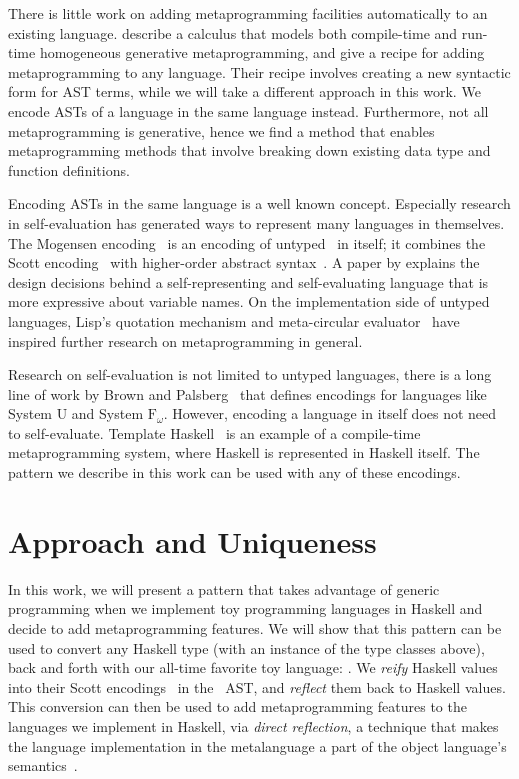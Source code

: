 \documentclass[format=acmsmall, review=false, screen=true]{acmart}
\begin{document}
There is little work on adding metaprogramming facilities automatically to an existing language.
\citet{hgmp} describe a calculus that models both compile-time and run-time homogeneous generative metaprogramming, and give a recipe for adding metaprogramming to any language.
Their recipe involves creating a new syntactic form for AST terms, while we
will take a different approach in this work.
We encode ASTs of a language in the same language instead.
Furthermore, not all metaprogramming is generative, hence we find a method that enables metaprogramming methods that involve breaking down existing data type and function definitions.

Encoding ASTs in the same language is a well known concept.
Especially research in self-evaluation has generated ways to represent many
languages in themselves.  The Mogensen encoding~\cite{mogensen} is an encoding
of untyped \lc\ in itself; it combines the Scott encoding~\cite{scott} with
higher-order abstract syntax~\cite{hoas}.
A paper by \citet{stump2009directly} explains the design decisions behind a
self-representing and self-evaluating language that is more expressive about
variable names.  On the implementation side of untyped languages, Lisp's
quotation mechanism and meta-circular evaluator~\cite{mccarthy1965lisp}
have inspired further research on metaprogramming in general.

Research on self-evaluation is not limited to untyped languages, there is a
long line of work by Brown and
Palsberg~\cite{brownU,brownBreaking,brownIntensional} that defines encodings
for languages like System U and System $\text{F}_\omega$.
However, encoding a language in itself does not need to self-evaluate.
Template Haskell~\cite{sheard2002template} is an example of a compile-time
metaprogramming system, where Haskell is represented in Haskell itself.
The pattern we describe in this work can be used with any of these encodings.


\section{Approach and Uniqueness}

In this work, we will present a pattern that takes advantage of generic programming
when we implement toy programming languages in Haskell and decide to add
metaprogramming features. We will show that this pattern
can be used to convert any Haskell type (with an instance of the type classes
above), back and forth with our all-time favorite toy language: \lc.
We \mbox{\emph{reify}} Haskell values into their Scott encodings~\cite{scott}
in the \lc\ AST, and \mbox{\emph{reflect}} them back to Haskell values.
This conversion can then be used to add metaprogramming features to the languages we implement in Haskell, via
  \emph{direct reflection}, a technique that makes the language implementation
  in the metalanguage a part of the object language's semantics~\cite{barzilayphd}.
\end{document}
